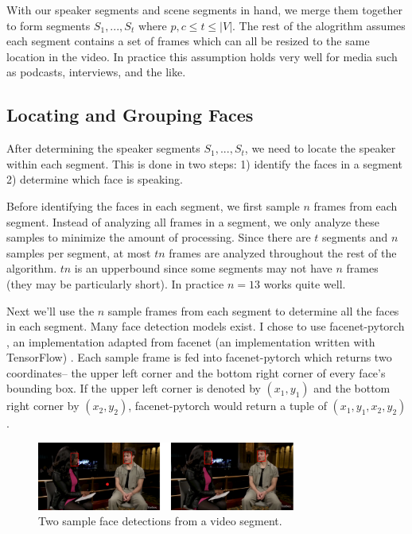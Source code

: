 \documentclass{article}
\begin{document}
With our speaker segments and scene segments in hand, we merge them together to form segments $S_1, ..., S_t$ where $p, c \le t \le |V|$. The rest of the alogrithm assumes each segment contains a set of frames which can all be resized to the same location in the video. In practice this assumption holds very well for media such as podcasts, interviews, and the like. 


\subsection{Locating and Grouping Faces}
\label{ssec:locating-and-grouping-faces}

After determining the speaker segments $S_1, ..., S_t$, we need to locate the speaker within each segment. This is done in two steps: 1) identify the faces in a segment 2) determine which face is speaking.

Before identifying the faces in each segment, we first sample $n$ frames from each segment. Instead of analyzing all frames in a segment, we only analyze these samples to minimize the amount of processing. Since there are $t$ segments and $n$ samples per segment, at most $tn$ frames are analyzed throughout the rest of the algorithm. $tn$ is an upperbound since some segments may not have $n$ frames (they may be particularly short). In practice $n = 13$ works quite well.

Next we'll use the $n$ sample frames from each segment to determine all the faces in each segment. Many face detection models exist. I chose to use facenet-pytorch \cite{FacenetPyTorch} \cite{Facenet} \cite{VGGFace2} \cite{FaceRepresentation} \cite{CascadedConvolution}, an implementation adapted from facenet (an implementation written with TensorFlow) \cite{FacenetTensorFlow}. Each sample frame is fed into facenet-pytorch which returns two coordinates-- the upper left corner and the bottom right corner of every face's bounding box. If the upper left corner is denoted by $(x_1, y_1)$ and the bottom right corner by $(x_2, y_2)$, facenet-pytorch would return a tuple of $(x_1, y_1, x_2, y_2)$.

\begin{figure}[htb]
\begin{minipage}[b]{1.0\linewidth}
    \centering
    \centerline{\includegraphics[width=8.5cm]{sample-face-detections.png}}
    \medskip
\end{minipage}
\caption{Two sample face detections from a video segment.}
\label{fig:sample-face-detections}
\end{figure}
\end{document}
